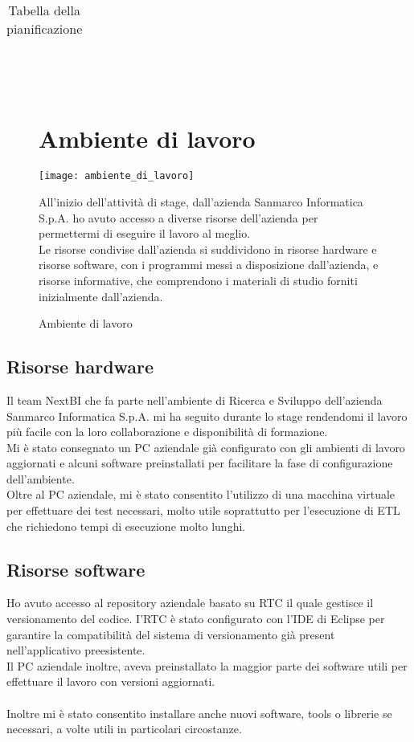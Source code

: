\begin{table}
\begin{tabular}{ |p{3cm}|p{1cm}|p{8cm}| }
\end{tabular}
\\\\
\caption{Tabella della pianificazione}
\end{table}




 \clearpage
\begin{figure}[h!]
\section{Ambiente di lavoro}
\begin{center}
    \texttt{[image: ambiente\_di\_lavoro]} 
    \caption{Ambiente di lavoro}
    \end{center}
 All'inizio dell'attività di stage, dall'azienda Sanmarco Informatica S.p.A. ho avuto accesso a diverse risorse dell'azienda per permettermi di eseguire il lavoro al meglio. \\
Le risorse condivise dall'azienda si suddividono in risorse hardware e risorse software, con i programmi messi a disposizione dall'azienda, e risorse informative, che comprendono i materiali di studio forniti inizialmente dall'azienda. 
\end{figure}  



\subsection{Risorse hardware}

Il team NextBI che fa parte nell'ambiente di Ricerca e Sviluppo dell'azienda Sanmarco Informatica S.p.A. mi ha seguito durante lo stage rendendomi il lavoro più facile con la loro collaborazione e disponibilità di formazione. \\

Mi è stato consegnato un PC aziendale già configurato con gli ambienti di lavoro aggiornati e alcuni software preinstallati per facilitare la fase di configurazione dell'ambiente. \\
Oltre al PC aziendale, mi è stato consentito l'utilizzo di una macchina virtuale per effettuare dei test necessari, molto utile soprattutto per l'esecuzione di ETL che richiedono tempi di esecuzione molto lunghi. 
\subsection{Risorse software}
Ho avuto accesso al repository aziendale basato su RTC il quale gestisce il versionamento del codice. I'RTC è stato configurato con l'IDE di Eclipse per garantire la compatibilità del sistema di versionamento già present nell'applicativo preesistente. \\
Il PC aziendale inoltre, aveva preinstallato la maggior parte dei software utili per effettuare il lavoro con versioni aggiornati. \\\\
Inoltre mi è stato consentito installare anche nuovi software, tools o librerie se necessari, a volte utili in particolari circostanze.

